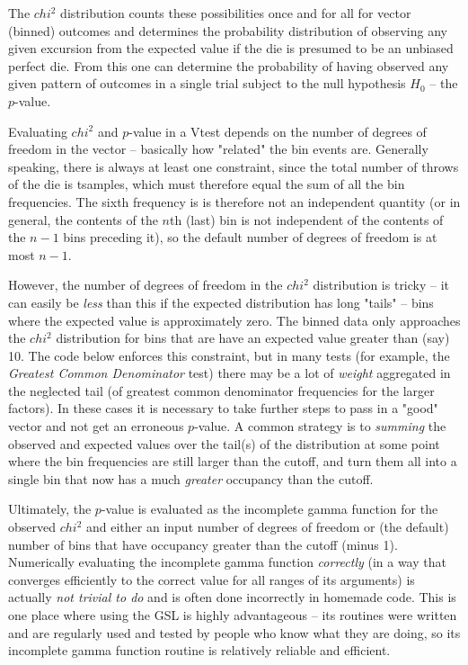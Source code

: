 \documentclass[12pt]{book}
\begin{document}
The $chi^2$ distribution counts these possibilities once and for all for
vector (binned) outcomes and determines the probability distribution of
observing any given excursion from the expected value if the die is
presumed to be an unbiased perfect die.  From this one can determine the
probability of having observed any given pattern of outcomes in a single
trial subject to the null hypothesis $H_0$ -- the $p$-value.

Evaluating $chi^2$ and $p$-value in a Vtest depends on the number of
degrees of freedom in the vector -- basically how "related" the bin
events are.  Generally speaking, there is always at least one
constraint, since the total number of throws of the die is tsamples,
which must therefore equal the sum of all the bin frequencies.  The
sixth frequency is is therefore not an independent quantity (or in
general, the contents of the $n$th (last) bin is not independent of the
contents of the $n-1$ bins preceding it), so the default number of
degrees of freedom is at most $n-1$.

However, the number of degrees of freedom in the $chi^2$ distribution is
tricky -- it can easily be {\em less} than this if the expected
distribution has long "tails" -- bins where the expected value is
approximately zero.  The binned data only approaches the $chi^2$
distribution for bins that are have an expected value greater than (say)
10.  The code below enforces this constraint, but in many tests (for
example, the {\em Greatest Common Denominator} test) there may be a lot
of {\em weight} aggregated in the neglected tail (of greatest common
denominator frequencies for the larger factors).  In these cases it is
necessary to take further steps to pass in a "good" vector and not get
an erroneous $p$-value.  A common strategy is to {\em summing} the
observed and expected values over the tail(s) of the distribution at
some point where the bin frequencies are still larger than the cutoff,
and turn them all into a single bin that now has a much {\em greater}
occupancy than the cutoff.

Ultimately, the $p$-value is evaluated as the incomplete gamma function
for the observed $chi^2$ and either an input number of degrees of
freedom or (the default) number of bins that have occupancy greater than
the cutoff (minus 1).  Numerically evaluating the incomplete gamma
function {\em correctly} (in a way that converges efficiently to the
correct value for all ranges of its arguments) is actually {\em not
trivial to do} and is often done incorrectly in homemade code.  This is
one place where using the GSL is highly advantageous -- its routines
were written and are regularly used and tested by people who know what
they are doing, so its incomplete gamma function routine is relatively
reliable and efficient.
\end{document}
